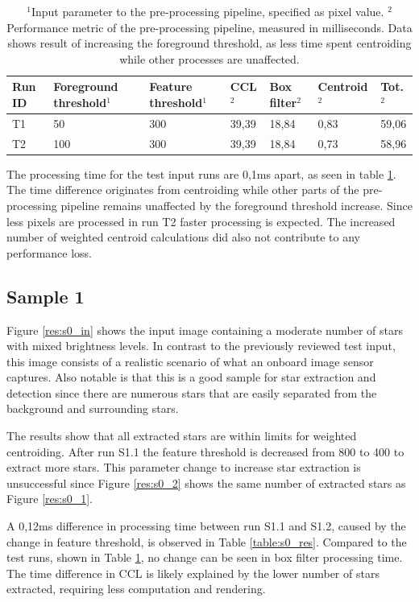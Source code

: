 \documentclass[12pt]{report}
\begin{document}
\begin{table}[!h]
    \centering
    \begin{tabular}{|p{0.8cm}|p{2.5cm}|p{2cm}||p{1.25cm}|p{1.25cm}|p{1.9cm}|p{1cm}|}
        \hline
        \textbf{Run ID}&\textbf{Foreground threshold$^{1}$}&\textbf{Feature threshold$^{1}$}&\textbf{CCL$^{2}$}&\textbf{Box filter$^{2}$}&\textbf{Centroid$^{2}$}&\textbf{Tot.$^{2}$}\\
        \hline
        \hline
        T1&50&300&39,39&18,84&0,83&59,06\\
        \hline
        T2&100&300&39,39&18,84&0,73&58,96\\
        \hline
    \end{tabular}
    \caption{$^{1}$Input parameter to the pre-processing pipeline, specified as pixel value. $^{2}$Performance metric of the pre-processing pipeline, measured in milliseconds. Data shows result of increasing the foreground threshold, as less time spent centroiding while other processes are unaffected.}
    \label{table:t_res}
\end{table}

The processing time for the test input runs are 0,1ms apart, as seen in table \ref{table:t_res}. The time difference originates from centroiding while other parts of the pre-processing pipeline remains unaffected by the foreground threshold increase. Since less pixels are processed in run T2 faster processing is expected. The increased number of weighted centroid calculations did also not contribute to any performance loss.

\subsection*{Sample 1}

Figure \ref{res:s0_in} shows the input image containing a moderate number of stars with mixed brightness levels. In contrast to the previously reviewed test input, this image consists of a realistic scenario of what an onboard image sensor captures. Also notable is that this is a good sample for star extraction and detection since there are numerous stars that are easily separated from the background and surrounding stars.
\par
The results show that all extracted stars are within limits for weighted centroiding. After run S1.1 the feature threshold is decreased from 800 to 400 to extract more stars. This parameter change to increase star extraction is unsuccessful since Figure \ref{res:s0_2} shows the same number of extracted stars as Figure \ref{res:s0_1}.  
\par
A 0,12ms difference in processing time between run S1.1 and S1.2, caused by the change in feature threshold, is observed in Table \ref{table:s0_res}. Compared to the test runs, shown in Table \ref{table:t_res}, no change can be seen in box filter processing time. The time difference in CCL is likely explained by the lower number of stars extracted, requiring less computation and rendering.
\end{document}

